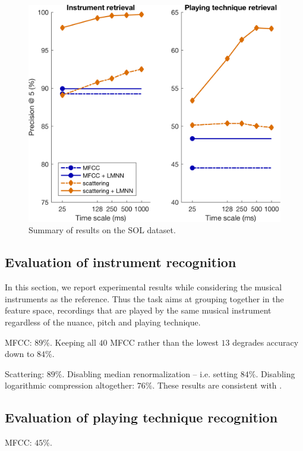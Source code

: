 \documentclass{article}
\makeatletter
\newcommand*{\ie}{i.e.\@\xspace}
\makeatother
\begin{document}
\begin{figure}
\includegraphics[width=\linewidth,keepaspectratio]{./figs/results/results.png}
\caption{Summary of results on the SOL dataset.}
\label{fig:dataset-statistics}
\end{figure}

\subsection{Evaluation of instrument recognition}

In this section, we report experimental results while considering the musical instruments as the reference. Thus the task aims at grouping together in the feature space, recordings that are played by the same musical instrument regardless of the nuance, pitch and playing technique.

MFCC: $89\%$.
Keeping all $40$ MFCC rather than the lowest $13$ degrades accuracy down to $84\%$.


Scattering: $89\%$.
Disabling median renormalization -- \ie{} setting  $84\%$.
Disabling logarithmic compression altogether: $76\%$.
These results are consistent with \cite{lostanlen2018eurasip}.


\subsection{Evaluation of playing technique recognition}

MFCC: $45\%$. 
\end{document}
